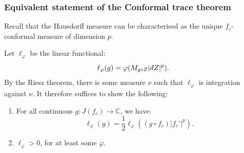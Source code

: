 \documentclass{beamer} %
\theoremstyle{definition} %
\newcommand{\Cplx}{\mathbb{C}}
\newcommand{\Lc}{\mathcal{L}}
\def\qd{\,{\mathchar'26\mkern-12mu d}}
\begin{document}
% 
% 
\begin{frame}\frametitle{Equivalent statement of the Conformal trace theorem}
    Recall that the Hausdorff measure can be characterised as the unique $f_c$-conformal measure of dimension $p$. 
    
    Let $\ell_{\varphi}$ be the linear functional:
    \begin{equation*}
        \ell_{\varphi}(g) = \varphi(M_{g\circ Z}|\qd Z|^p).
    \end{equation*}
    By the Riesz theorem, there is some measure $\nu$ such that $\ell_\varphi$ is integration against $\nu$.
    It therefore suffices to show the following:
    \begin{enumerate}
        \item{} For all continuous $g:J(f_c)\to \Cplx$, we have:
            \begin{equation*}
                \ell_{\varphi}(g) = \frac{1}{2}\ell_\varphi((g\circ f_c)|f_c'|^p).
            \end{equation*}
        \item{} $\ell_{\varphi} > 0$, for at least some $\varphi$.
    \end{enumerate}
\end{frame}
% 
\end{document}
